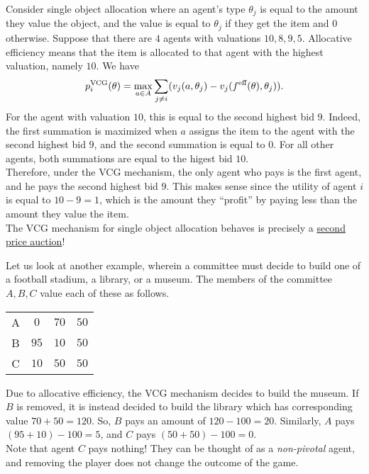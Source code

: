 		\begin{fex}
			\label{vcg obj allocation}
			Consider single object allocation where an agent's type $\theta_j$ is equal to the amount they value the object, and the value is equal to $\theta_j$ if they get the item and $0$ otherwise. Suppose that there are $4$ agents with valuations $10,8,9,5$. Allocative efficiency means that the item is allocated to that agent with the highest valuation, namely $10$. We have
			\[ p_i^{\text{VCG}}(\theta) = \max_{a \in A} \sum_{j \ne i} (v_j(a,\theta_j) - v_j(f^{\text{eff}}(\theta),\theta_j)). \]
			For the agent with valuation $10$, this is equal to the second highest bid $9$. Indeed, the first summation is maximized when $a$ assigns the item to the agent with the second highest bid $9$, and the second summation is equal to $0$. For all other agents, both summations are equal to the higest bid $10$.\\
			Therefore, under the VCG mechanism, the only agent who pays is the first agent, and he pays the second highest bid $9$. This makes sense since the utility of agent $i$ is equal to $10-9 = 1$, which is the amount they ``profit'' by paying less than the amount they value the item.\\
			The VCG mechanism for single object allocation behaves is precisely a \hyperref[ex: second price auction]{second price auction}!

			Let us look at another example, wherein a committee must decide to build one of a football stadium, a library, or a museum. The members of the committee $A,B,C$ value each of these as follows.
			\begin{center}
			\begin{tabular}{|c||c|c|c|}
				\hline
				& \text{Football} & \text{Library} & \text{Museum} \\
				\hline\hline
				A & $0$ & $70$ & $50$ \\
				\hline
				B & $95$ & $10$ & $50$ \\
				\hline
				C & $10$ & $50$ & $50$ \\ \hline
			\end{tabular}
			\end{center}
			Due to allocative efficiency, the VCG mechanism decides to build the museum. If $B$ is removed, it is instead decided to build the library which has corresponding value $70+50 = 120$. So, $B$ pays an amount of $120-100 = 20$. Similarly, $A$ pays $(95+10)-100 = 5$, and $C$ pays $(50+50)-100 = 0$.\\
			Note that agent $C$ pays nothing! They can be thought of as a \emph{non-pivotal} agent, and removing the player does not change the outcome of the game.
		\end{fex}

